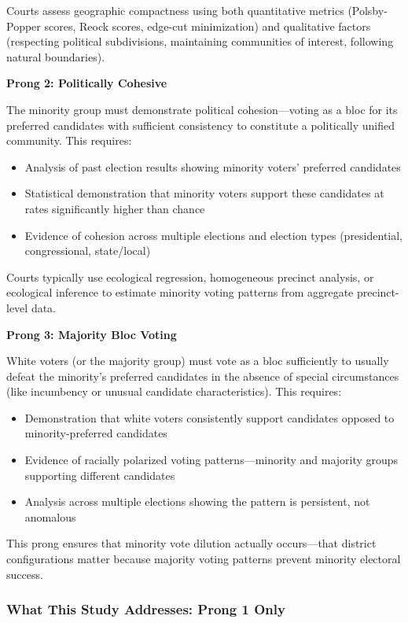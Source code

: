 Courts assess geographic compactness using both quantitative metrics (Polsby-Popper scores, Reock scores, edge-cut minimization) and qualitative factors (respecting political subdivisions, maintaining communities of interest, following natural boundaries).

\textbf{Prong 2: Politically Cohesive}

The minority group must demonstrate political cohesion---voting as a bloc for its preferred candidates with sufficient consistency to constitute a politically unified community. This requires:

\begin{itemize}
    \item Analysis of past election results showing minority voters' preferred candidates
    \item Statistical demonstration that minority voters support these candidates at rates significantly higher than chance
    \item Evidence of cohesion across multiple elections and election types (presidential, congressional, state/local)
\end{itemize}

Courts typically use ecological regression, homogeneous precinct analysis, or ecological inference to estimate minority voting patterns from aggregate precinct-level data.

\textbf{Prong 3: Majority Bloc Voting}

White voters (or the majority group) must vote as a bloc sufficiently to usually defeat the minority's preferred candidates in the absence of special circumstances (like incumbency or unusual candidate characteristics). This requires:

\begin{itemize}
    \item Demonstration that white voters consistently support candidates opposed to minority-preferred candidates
    \item Evidence of racially polarized voting patterns---minority and majority groups supporting different candidates
    \item Analysis across multiple elections showing the pattern is persistent, not anomalous
\end{itemize}

This prong ensures that minority vote dilution actually occurs---that district configurations matter because majority voting patterns prevent minority electoral success.

\subsubsection{What This Study Addresses: Prong 1 Only}

